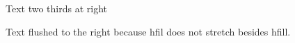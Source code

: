 Text two thirds at right


Text flushed to the right because hfil does not stretch besides hfill.



\bye


